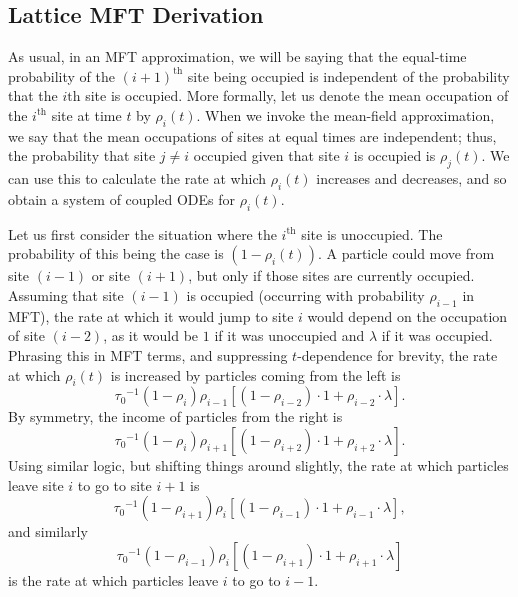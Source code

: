 \subsection{Lattice MFT Derivation} 
\label{sec:latticeMFT}

As usual, in an MFT approximation, we will be saying that the equal-time probability of the $(i+1)^\mathrm{th}$ site being occupied is independent of the probability that the $i\mathrm{th}$ site is occupied.
More formally, let us denote the mean occupation of the $i^\mathrm{th}$ site at time $t$ by $\rho_i (t)$. When we invoke the mean-field approximation, we say that the mean occupations of sites at equal times are independent; thus,
the probability that site $j \ne i$ occupied given that site $i$ is occupied is $\rho_j (t)$. We can use this to calculate the rate at which $\rho_i (t)$ increases and decreases, and so obtain a system of coupled ODEs for $\rho_i (t)$.

Let us first consider the situation where the $i^\mathrm{th}$ site is unoccupied. The probability of this being the case is $(1-\rho_i (t))$. A particle could move from site $(i-1)$ or site $(i+1)$, but only if those sites are currently occupied.
Assuming that site $(i-1)$ is occupied (occurring with probability $\rho_{i-1}$ in MFT), the rate at which it would jump to site $i$ would depend on the occupation of site $(i-2)$,
as it would be $1$ if it was unoccupied and $\lambda$ if it was occupied. Phrasing this in MFT terms,
and suppressing $t$-dependence for brevity, the rate at which $\rho_i (t)$ is increased by particles coming from the left is
\begin{equation}
{\tau_0}^{-1} \left(1-\rho_i \right) \rho_{i-1} \left[ \left(1-\rho_{i-2} \right) \cdot 1  +   \rho_{i-2} \cdot \lambda \right].
\end{equation}
By symmetry, the income of particles from the right is
\begin{equation}
{\tau_0}^{-1} \left(1-\rho_i \right) \rho_{i+1} \left[ \left(1-\rho_{i+2} \right) \cdot 1  +   \rho_{i+2} \cdot \lambda \right].
\end{equation}
Using similar logic, but shifting things around slightly, the rate at which particles leave site $i$ to go to site $i+1$ is
\begin{equation}
{\tau_0}^{-1} \left(1-\rho_{i+1} \right) \rho_{i} \left[ \left(1-\rho_{i-1} \right) \cdot 1  +   \rho_{i-1} \cdot \lambda \right],
\end{equation}
and similarly 
\begin{equation}
{\tau_0}^{-1} \left(1-\rho_{i-1} \right) \rho_{i} \left[ \left(1-\rho_{i+1} \right) \cdot 1  +   \rho_{i+1} \cdot \lambda \right]
\end{equation}
is the rate at which particles leave $i$ to go to $i-1$.

